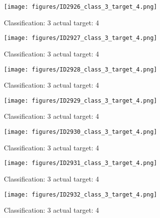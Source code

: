 \begin{figure}[h!]
\begin{center}
\texttt{[image: figures/ID2926\_class\_3\_target\_4.png]}
\end{center}
\caption{ Classification: 3 actual target: 4}
\label{fig:ID2926_class_3_target_4}
\end{figure}
\begin{figure}[h!]
\begin{center}
\texttt{[image: figures/ID2927\_class\_3\_target\_4.png]}
\end{center}
\caption{ Classification: 3 actual target: 4}
\label{fig:ID2927_class_3_target_4}
\end{figure}
\begin{figure}[h!]
\begin{center}
\texttt{[image: figures/ID2928\_class\_3\_target\_4.png]}
\end{center}
\caption{ Classification: 3 actual target: 4}
\label{fig:ID2928_class_3_target_4}
\end{figure}
\begin{figure}[h!]
\begin{center}
\texttt{[image: figures/ID2929\_class\_3\_target\_4.png]}
\end{center}
\caption{ Classification: 3 actual target: 4}
\label{fig:ID2929_class_3_target_4}
\end{figure}
\begin{figure}[h!]
\begin{center}
\texttt{[image: figures/ID2930\_class\_3\_target\_4.png]}
\end{center}
\caption{ Classification: 3 actual target: 4}
\label{fig:ID2930_class_3_target_4}
\end{figure}
\begin{figure}[h!]
\begin{center}
\texttt{[image: figures/ID2931\_class\_3\_target\_4.png]}
\end{center}
\caption{ Classification: 3 actual target: 4}
\label{fig:ID2931_class_3_target_4}
\end{figure}
\begin{figure}[h!]
\begin{center}
\texttt{[image: figures/ID2932\_class\_3\_target\_4.png]}
\end{center}
\caption{ Classification: 3 actual target: 4}
\label{fig:ID2932_class_3_target_4}
\end{figure}
